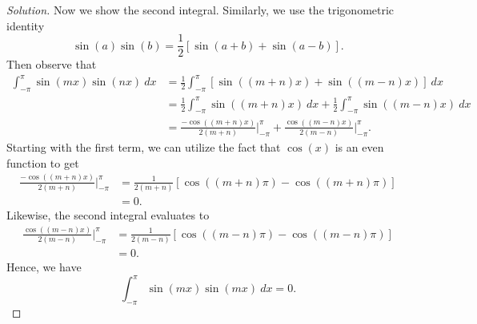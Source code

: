\begin{enumerate}
\begin{proof}[Solution]
      Now we show the second integral. Similarly, we use the trigonometric identity
      \[ \sin(a)\sin(b) = \frac{ 1 }{ 2 }  [ \sin(a+b) + \sin(a-b) ]. \]
      Then observe that
      \begin{align*}
          \int_{ -\pi  }^{ \pi  } \sin(mx) \sin(nx)  \ dx &= \frac{ 1 }{ 2 } \int_{ - \pi  }^{ \pi  } [ \sin((m+n)x) + \sin((m-n)x)]  \ dx \\
                                                          &= \frac{ 1 }{ 2 } \int_{ - \pi  }^{ \pi  } \sin((m+n)x) \ dx + \frac{ 1 }{ 2 } \int_{ - \pi  }^{ \pi  } \sin((m-n)x) \ dx \\
                                                          &= \frac{ -\cos((m+n)x) }{ 2(m+n) } \Big|_{-\pi}^{\pi} + \frac{ \cos((m-n)x) }{ 2(m-n) } \Big|_{- \pi}^{\pi}.   
      \end{align*}
      Starting with the first term, we can utilize the fact that \( \cos(x) \) is an even function to get
      \begin{align*}
          \frac{ - \cos((m+n)x)  }{ 2(m+n)  } \Big|_{-\pi }^{\pi } &= \frac{ 1 }{ 2(m+n) } [ \cos((m+n) \pi) - \cos((m+n) \pi)] \\
                                                                   &= 0.
      \end{align*}
      Likewise, the second integral evaluates to 
      \begin{align*}
          \frac{ \cos((m-n)x) }{ 2(m-n) } \Big|_{- \pi}^{\pi} &= \frac{ 1 }{ 2(m-n) } [ \cos((m-n)\pi) - \cos((m-n)\pi)] \\
                                                              &= 0.
      \end{align*}
      Hence, we have 
      \[ \int_{ - \pi  }^{ \pi  } \sin(mx) \sin(mx)  \ dx = 0. \]

        \end{proof}
\end{enumerate}


